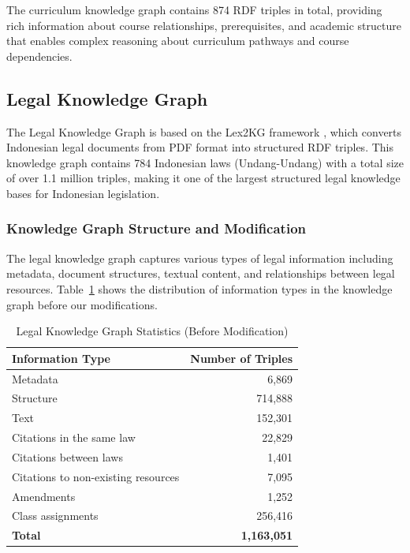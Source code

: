 The curriculum knowledge graph contains 874 RDF triples in total, providing rich information about course relationships, prerequisites, and academic structure that enables complex reasoning about curriculum pathways and course dependencies.

\subsection{Legal Knowledge Graph}
\label{legal-kg}

The Legal Knowledge Graph is based on the Lex2KG framework \citep{abdurahman2021lex2kg}, which converts Indonesian legal documents from PDF format into structured RDF triples. This knowledge graph contains 784 Indonesian laws (Undang-Undang) with a total size of over 1.1 million triples, making it one of the largest structured legal knowledge bases for Indonesian legislation.

\subsubsection{Knowledge Graph Structure and Modification}
The legal knowledge graph captures various types of legal information including metadata, document structures, textual content, and relationships between legal resources. Table~\ref{table-legal-statistics} shows the distribution of information types in the knowledge graph before our modifications.

\begin{table}[htbp]
\centering
\renewcommand{\arraystretch}{1.15}
\setlength{\tabcolsep}{12pt}
\caption{Legal Knowledge Graph Statistics (Before Modification)}
\begin{tabular}{| l | r |}
\hline
\textbf{Information Type} & \textbf{Number of Triples} \\
\hline
Metadata & 6,869 \\
Structure & 714,888 \\
Text & 152,301 \\
Citations in the same law & 22,829 \\
Citations between laws & 1,401 \\
Citations to non-existing resources & 7,095 \\
Amendments & 1,252 \\
Class assignments & 256,416 \\
\hline
\textbf{Total} & \textbf{1,163,051} \\
\hline
\end{tabular}
\label{table-legal-statistics}
\end{table}

